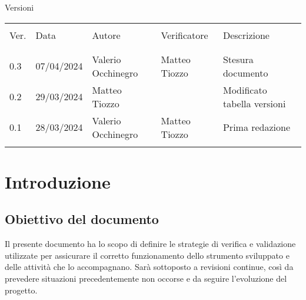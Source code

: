 \documentclass[italian,12pt]{article} %
\begin{document}


\newpage



\captionsetup[table]{list=no}

\begin{table}[!h]
	\begin{center}
		Versioni\\
		\vspace{0.5cm}
		\begin{tabular}{ l l l l l }
			\hline                                                                          		\\[-2ex]
			Ver. 	& Data			& Autore			 & Verificatore		& Descrizione\\
			\\[-2ex] \hline \\[-1.5ex]

			0.3 	 & 07/04/2024 	& Valerio Occhinegro & Matteo Tiozzo	& Stesura documento	\\
			0.2	     & 29/03/2024 	& Matteo Tiozzo 	 & 					& Modificato tabella versioni	\\
			0.1 	 & 28/03/2024 	& Valerio Occhinegro & Matteo Tiozzo 	& Prima redazione				\\
			\\[-1.5ex] \hline
		\end{tabular}
	\end{center}
\end{table}
\captionsetup[table]{list=yes}

\newpage

\tableofcontents

\newpage

\listoftables

\listoffigures

\newpage

\section{Introduzione}

\subsection{Obiettivo del documento}
Il presente documento ha lo scopo di definire le strategie di verifica e validazione utilizzate per assicurare il corretto funzionamento dello strumento sviluppato e delle
attività che lo accompagnano.  Sarà sottoposto a revisioni continue, così da prevedere situazioni precedentemente non occorse e da seguire l'evoluzione del progetto.
\end{document}
